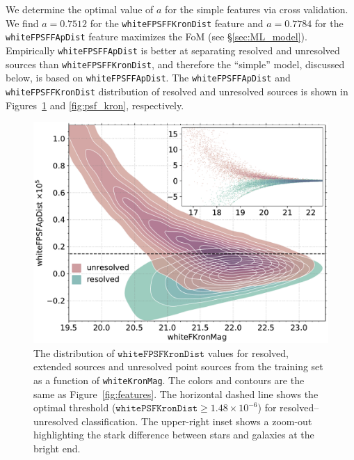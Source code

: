 \documentclass[twocolumn]{aastex63}
\begin{document}
We determine the optimal value of $a$ for the simple features via cross
validation. We find $a = 0.7512$ for the \texttt{whiteFPSFFKronDist} feature
and $a = 0.7784$ for the \texttt{whiteFPSFFApDist} feature maximizes the FoM
(see \S\ref{sec:ML_model}). Empirically \texttt{whiteFPSFFApDist} is better at
separating resolved and unresolved sources than \texttt{whiteFPSFFKronDist},
and therefore the ``simple'' model, discussed below, is based on
\texttt{whiteFPSFFApDist}. The \texttt{whiteFPSFFApDist} and
\texttt{whiteFPSFFKronDist} distribution of resolved and unresolved sources is
shown in Figures~\ref{fig:psf_ap} and \ref{fig:psf_kron}, respectively.

\begin{figure}
    \centering
    \includegraphics[width=\columnwidth]{./figures/whiteFPSFApDist.pdf}
    \caption{The distribution of $\mathtt{whiteFPSFKronDist}$ values for
    resolved, extended sources and unresolved point sources from the training
    set as a function of \texttt{whiteKronMag}. The colors and contours are
    the same as Figure~\ref{fig:features}. The horizontal dashed line shows
    the optimal threshold ($\mathtt{whitePSFKronDist} \ge 1.48 \times
    10^{-6}$) for resolved--unresolved classification. The upper-right inset
    shows a zoom-out highlighting the stark difference between stars and
    galaxies at the bright end.}
    \label{fig:psf_ap}
\end{figure}
\end{document}
